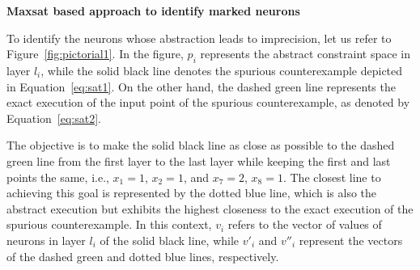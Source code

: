 \noindent\textbf{Maxsat based approach to identify marked neurons}\\
{\color{red} To identify the neurons whose abstraction leads to imprecision, let us refer to Figure~\ref{fig:pictorial1}. 
In the figure, $p_i$ represents the abstract constraint space in layer $l_i$, while the solid black line denotes 
the spurious counterexample depicted in Equation~\ref{eq:sat1}. 
On the other hand, the dashed green line represents the exact execution of the input point of the spurious counterexample, 
as denoted by Equation~\ref{eq:sat2}.

The objective is to make the solid black line as close as possible to the dashed green line from the first layer to the last layer 
while keeping the first and last points the same, i.e., $x_1 = 1$, $x_2 = 1$, and $x_7 = 2$, $x_8 = 1$. 
The closest line to achieving this goal is represented by the dotted blue line, 
which is also the abstract execution but exhibits the highest closeness to the exact execution of the spurious counterexample.
In this context, $v_i$ refers to the vector of values of neurons in layer $l_i$ of the solid black line, 
while $v'_i$ and $v''_i$ represent the vectors of the dashed green and dotted blue lines, respectively.
}

